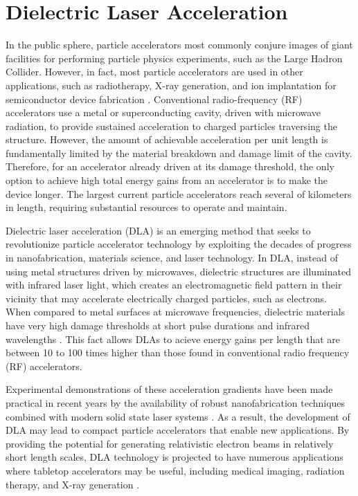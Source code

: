
\section{Dielectric Laser Acceleration}

In the public sphere, particle accelerators most commonly conjure images of giant facilities for performing particle physics experiments, such as the Large Hadron Collider.
However, in fact, most particle accelerators are used in other applications, such as radiotherapy, X-ray generation, and ion implantation for semiconductor device fabrication \cite{england2014dielectric}.
Conventional radio-frequency (RF) accelerators use a metal or superconducting cavity, driven with microwave radiation, to provide sustained acceleration to charged particles traversing the structure.
However, the amount of achievable acceleration per unit length is fundamentally limited by the material breakdown and damage limit of the cavity.
Therefore, for an accelerator already driven at its damage threshold, the only option to achieve high total energy gains from an accelerator is to make the device longer.
The largest current particle accelerators reach several of kilometers in length, requiring substantial resources to operate and maintain.

Dielectric laser acceleration (DLA) is an emerging method that seeks to revolutionize particle accelerator technology by exploiting the decades of progress in nanofabrication, materials science, and laser technology.
In DLA, instead of using metal structures driven by microwaves, dielectric structures are illuminated with infrared laser light, which creates an electromagnetic field pattern in their vicinity that may accelerate electrically charged particles, such as electrons.
When compared to metal surfaces at microwave frequencies, dielectric materials have very high damage thresholds at short pulse durations and infrared wavelengths \cite{mcneur2016elements, soong2012laser}.
This fact allows DLAs to acieve energy gains per length that are between 10 to 100 times higher than those found in conventional radio frequency (RF) accelerators.

Experimental demonstrations of these acceleration gradients have been made practical in recent years by the availability of robust nanofabrication techniques combined with modern solid state laser systems \cite{dawson2008analysis}.
As a result, the development of DLA may lead to compact particle accelerators that enable new applications.
By providing the potential for generating relativistic electron beams in relatively short length scales, DLA technology is projected to have numerous applications where tabletop accelerators may be useful, including medical imaging, radiation therapy, and X-ray generation \cite{plettner2008microstructure,england2014dielectric}.

